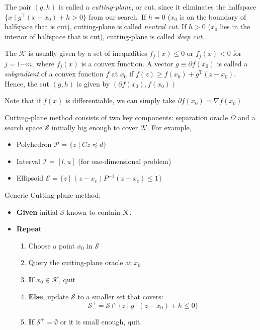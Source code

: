 \documentclass[]{article}
\providecommand{\tightlist}{%
  \setlength{\itemsep}{0pt}\setlength{\parskip}{0pt}}
\begin{document}
The pair \((g, h)\) is called a \emph{cutting-plane}, or cut, since it
eliminates the halfspace \(\{x \mid g^\top (x - x_0) + h > 0\}\) from
our search. If \(h=0\) (\(x_0\) is on the boundary of halfspace that is
cut), cutting-plane is called \emph{neutral cut}. If \(h>0\) (\(x_0\)
lies in the interior of halfspace that is cut), cutting-plane is called
\emph{deep cut}.

The \(\mathcal{K}\) is usually given by a set of inequalities
\(f_j(x) \le 0\) or \(f_j(x) < 0\) for \(j = 1 \cdots m\), where
\(f_j(x)\) is a convex function. A vector \(g \equiv \partial f(x_0)\)
is called a \emph{subgradient} of a convex function \(f\) at \(x_0\) if
\(f(z) \geq f(x_0) + g^\mathrm{T} (z - x_0)\). Hence, the cut \((g, h)\)
is given by \((\partial f(x_0), f(x_0))\)

Note that if \(f(x)\) is differentiable, we can simply take
\(\partial f(x_0) = \nabla f(x_0)\)

Cutting-plane method consists of two key components: separation oracle
\(\Omega\) and a search space \(\mathcal{S}\) initially big enough to
cover \(\mathcal{K}\). For example,

\begin{itemize}
\tightlist
\item
  Polyhedron \(\mathcal{P}\) = \(\{z \mid C z \preceq d \}\)
\item
  Interval \(\mathcal{I}\) = \([l, u]\) (for one-dimensional problem)
\item
  Ellipsoid \(\mathcal{E}\) =
  \(\{z \mid (z-x_c)P^{-1}(z-x_c) \leq 1 \}\)
\end{itemize}

Generic Cutting-plane method:

\begin{itemize}
\tightlist
\item
  \textbf{Given} initial \(\mathcal{S}\) known to contain
  \(\mathcal{K}\).
\item
  \textbf{Repeat}

  \begin{enumerate}
  \def\labelenumi{\arabic{enumi}.}
  \tightlist
  \item
    Choose a point \(x_0\) in \(\mathcal{S}\)
  \item
    Query the cutting-plane oracle at \(x_0\)
  \item
    \textbf{If} \(x_0 \in \mathcal{K}\), quit
  \item
    \textbf{Else}, update \(\mathcal{S}\) to a smaller set that covers:
    \[\mathcal{S}^+ = \mathcal{S} \cap \{z \mid g^\top (z - x_0) + h \leq 0\}\]
  \item
    \textbf{If} \(\mathcal{S}^+ = \emptyset\) or it is small enough,
    quit.
  \end{enumerate}
\end{itemize}
\end{document}
